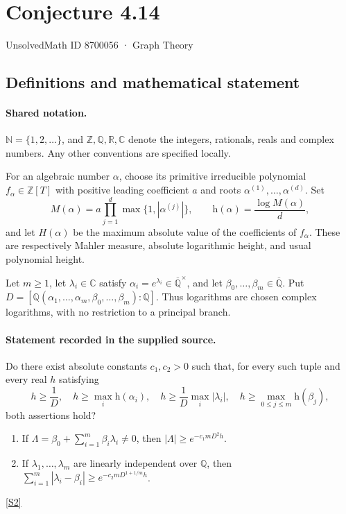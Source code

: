 \documentclass[11pt]{article}
\newcommand{\sref}[2]{\hyperlink{source:#1:#2}{[S#2]}}
\begin{document}
\setcounter{section}{8700055}
\section{Conjecture 4.14}\label{8700056}
{\small\sffamily UnsolvedMath ID 8700056 · Graph Theory}
\subsection{Definitions and mathematical statement}

\paragraph{Shared notation.}$\mathbb N=\{1,2,\ldots\}$, and $\mathbb Z,\mathbb Q,\mathbb R,\mathbb C$ denote the integers, rationals, reals and complex numbers. Any other conventions are specified locally.


For an algebraic number $\alpha$, choose its primitive irreducible polynomial $f_\alpha\in\mathbb Z[T]$ with positive leading coefficient $a$ and roots $\alpha^{(1)},\ldots,\alpha^{(d)}$. Set
\[
 M(\alpha)=a\prod_{j=1}^d\max\{1,|\alpha^{(j)}|\},\qquad
 \mathrm h(\alpha)=\frac{\log M(\alpha)}d,
\]
and let $H(\alpha)$ be the maximum absolute value of the coefficients of $f_\alpha$. These are respectively Mahler measure, absolute logarithmic height, and usual polynomial height.

Let $m\ge1$, let $\lambda_i\in\mathbb C$ satisfy $\alpha_i=e^{\lambda_i}\in\overline{\mathbb Q}^{\times}$, and let $\beta_0,\ldots,\beta_m\in\overline{\mathbb Q}$. Put $D=[\mathbb Q(\alpha_1,\ldots,\alpha_m,\beta_0,\ldots,\beta_m):\mathbb Q]$. Thus logarithms are chosen complex logarithms, with no restriction to a principal branch.
\paragraph{Statement recorded in the supplied source.}
Do there exist absolute constants $c_1,c_2>0$ such that, for every such tuple and every real $h$ satisfying
\[
h\ge \frac1D,\quad h\ge\max_i\mathrm h(\alpha_i),\quad h\ge\frac1D\max_i|\lambda_i|,\quad h\ge\max_{0\le j\le m}\mathrm h(\beta_j),
\]
both assertions hold?
\begin{enumerate}
\item If $\Lambda=\beta_0+\sum_{i=1}^m\beta_i\lambda_i\ne0$, then $|\Lambda|\ge e^{-c_1mD^2h}$.
\item If $\lambda_1,\ldots,\lambda_m$ are linearly independent over $\mathbb Q$, then $\sum_{i=1}^m|\lambda_i-\beta_i|\ge e^{-c_2mD^{1+1/m}h}$.
\end{enumerate} \sref{8700056}{2}
\end{document}
